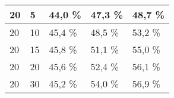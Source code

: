 \begin{table}[!htb]
\begin{tabular}{lllll}
\multicolumn{1}{|l|}{20}                                                     & \multicolumn{1}{l|}{5}                                                                                                        & \multicolumn{1}{l|}{44,0 \%}                                                                                          & \multicolumn{1}{l|}{47,3 \%}                                                                                           & \multicolumn{1}{l|}{48,7 \%}                                                                                           \\ \hline
\multicolumn{1}{|l|}{20}                                                     & \multicolumn{1}{l|}{10}                                                                                                       & \multicolumn{1}{l|}{45,4 \%}                                                                                          & \multicolumn{1}{l|}{48,5 \%}                                                                                           & \multicolumn{1}{l|}{53,2 \%}                                                                                           \\ \hline
\multicolumn{1}{|l|}{20}                                                     & \multicolumn{1}{l|}{15}                                                                                                       & \multicolumn{1}{l|}{45,8 \%}                                                                                          & \multicolumn{1}{l|}{51,1 \%}                                                                                           & \multicolumn{1}{l|}{55,0 \%}                                                                                           \\ \hline
\multicolumn{1}{|l|}{20}                                                     & \multicolumn{1}{l|}{20}                                                                                                       & \multicolumn{1}{l|}{45,6 \%}                                                                                          & \multicolumn{1}{l|}{52,4 \%}                                                                                           & \multicolumn{1}{l|}{56,1 \%}                                                                                           \\ \hline
\multicolumn{1}{|l|}{20}                                                     & \multicolumn{1}{l|}{30}                                                                                                       & \multicolumn{1}{l|}{45,2 \%}                                                                                          & \multicolumn{1}{l|}{54,0 \%}                                                                                           & \multicolumn{1}{l|}{56,9 \%}                                                                                           \\ \hline

\end{tabular}
\end{table}
